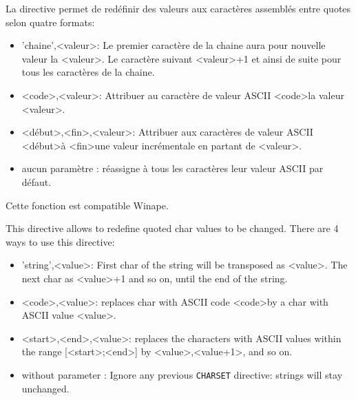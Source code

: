 \begin{xfr}
La directive permet de redéfinir des valeurs aux caractères assemblés entre quotes selon quatre formats:

\begin{itemize}
\item 'chaine',\textless valeur\textgreater : Le premier caractère de la chaine aura pour nouvelle valeur la \textless valeur\textgreater. Le caractère suivant \textless valeur\textgreater+1 et ainsi de suite pour tous les caractères de la chaine.
\item \textless code\textgreater,\textless valeur\textgreater : Attribuer au caractère de valeur ASCII \textless code\textgreater la valeur \textless valeur\textgreater.
\item \textless début\textgreater,\textless fin\textgreater,\textless valeur\textgreater : Attribuer aux caractères de valeur ASCII \textless début\textgreater à \textless fin\textgreater une valeur incrémentale en partant de \textless valeur\textgreater.
\item aucun paramètre : réassigne à tous les caractères leur valeur ASCII par défaut.
\end{itemize}
Cette fonction est compatible Winape.

\end{xfr}


\begin{xen}
This directive allows to redefine quoted char values to be changed. There are 4 ways to use this directive:

\begin{itemize}
\item 'string',\textless value\textgreater : First char of the string will be transposed as \textless value\textgreater. The next char as \textless value\textgreater+1 and so on, until the end of the string.
\item \textless code\textgreater,\textless value\textgreater : replaces char with ASCII code \textless code\textgreater by a char with ASCII value \textless value\textgreater.
\item \textless start\textgreater,\textless end\textgreater,\textless value\textgreater : replaces the characters with ASCII values within the range [\textless start\textgreater ;\textless end\textgreater] by \textless value\textgreater,\textless value+1\textgreater, and so on.
\item without parameter : Ignore any previous \texttt{CHARSET} directive: strings will stay unchanged.
\end{itemize}
\end{xen}

